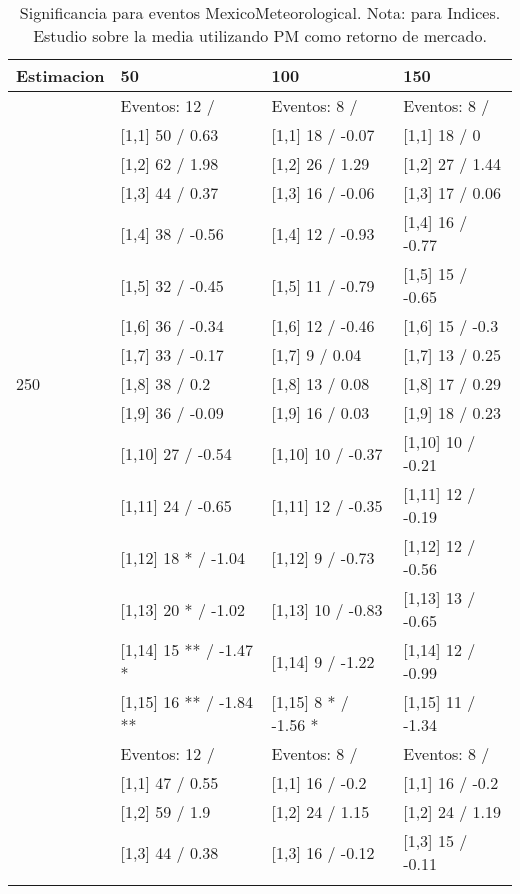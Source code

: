 \begin{table}

\caption{Significancia para eventos MexicoMeteorological. Nota: para Indices. Estudio sobre la media utilizando PM como retorno de mercado.}
\centering
\begin{tabular}[t]{llll}
\toprule
Estimacion & 50 & 100 & 150\\
\midrule
 & Eventos:  12 / & Eventos:  8 / & Eventos:  8 /\\
 & {}[1,1] 50  / 0.63 & {}[1,1] 18  / -0.07 & {}[1,1] 18  / 0\\
 & {}[1,2] 62  / 1.98 & {}[1,2] 26  / 1.29 & {}[1,2] 27  / 1.44\\
 & {}[1,3] 44  / 0.37 & {}[1,3] 16  / -0.06 & {}[1,3] 17  / 0.06\\
 & {}[1,4] 38  / -0.56 & {}[1,4] 12  / -0.93 & {}[1,4] 16  / -0.77\\
\addlinespace
 & {}[1,5] 32  / -0.45 & {}[1,5] 11  / -0.79 & {}[1,5] 15  / -0.65\\
 & {}[1,6] 36  / -0.34 & {}[1,6] 12  / -0.46 & {}[1,6] 15  / -0.3\\
 & {}[1,7] 33  / -0.17 & {}[1,7] 9  / 0.04 & {}[1,7] 13  / 0.25\\
250 & {}[1,8] 38  / 0.2 & {}[1,8] 13  / 0.08 & {}[1,8] 17  / 0.29\\
 & {}[1,9] 36  / -0.09 & {}[1,9] 16  / 0.03 & {}[1,9] 18  / 0.23\\
\addlinespace
 & {}[1,10] 27  / -0.54 & {}[1,10] 10  / -0.37 & {}[1,10] 10  / -0.21\\
 & {}[1,11] 24  / -0.65 & {}[1,11] 12  / -0.35 & {}[1,11] 12  / -0.19\\
 & {}[1,12] 18 * / -1.04 & {}[1,12] 9  / -0.73 & {}[1,12] 12  / -0.56\\
 & {}[1,13] 20 * / -1.02 & {}[1,13] 10  / -0.83 & {}[1,13] 13  / -0.65\\
 & {}[1,14] 15 ** / -1.47 * & {}[1,14] 9  / -1.22 & {}[1,14] 12  / -0.99\\
\addlinespace
 & {}[1,15] 16 ** / -1.84 ** & {}[1,15] 8 * / -1.56 * & {}[1,15] 11  / -1.34\\
 & Eventos:  12 / & Eventos:  8 / & Eventos:  8 /\\
 & {}[1,1] 47  / 0.55 & {}[1,1] 16  / -0.2 & {}[1,1] 16  / -0.2\\
 & {}[1,2] 59  / 1.9 & {}[1,2] 24  / 1.15 & {}[1,2] 24  / 1.19\\
 & {}[1,3] 44  / 0.38 & {}[1,3] 16  / -0.12 & {}[1,3] 15  / -0.11\\
\addlinespace

\end{tabular}
\end{table}
